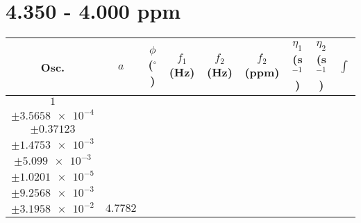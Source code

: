 \documentclass[8pt]{article}
\begin{document}
\section*{4.350 - 4.000 ppm}
\begin{longtable}[l]{c c c c c c c c c}
\toprule
Osc. & $a$ & $\phi$ ($^{\circ}$) & $f_1$ (Hz) & $f_2$ (Hz) & $f_2$ (ppm) & $\eta_1$ (s$^{-1}$) & $\eta_2$ (s$^{-1}$) & $\int$\\
\midrule
$\num{1}$ & \begin{tabular}[c]{@{}c@{}}$\num{5.493e-2}$ \\ $\pm\num{3.5658e-4}$\end{tabular} & \begin{tabular}[c]{@{}c@{}}$\num{-0.53219}$ \\ $\pm\num{0.37123}$\end{tabular} & \begin{tabular}[c]{@{}c@{}}$\num{-9.9663}$ \\ $\pm\num{1.4753e-3}$\end{tabular} & \begin{tabular}[c]{@{}c@{}}$\num{2.0216e+3}$ \\ $\pm\num{5.099e-3}$\end{tabular} & \begin{tabular}[c]{@{}c@{}}$\num{4.0442}$ \\ $\pm\num{1.0201e-5}$\end{tabular} & \begin{tabular}[c]{@{}c@{}}$\num{1.1779}$ \\ $\pm\num{9.2568e-3}$\end{tabular} & \begin{tabular}[c]{@{}c@{}}$\num{4.2579}$ \\ $\pm\num{3.1958e-2}$\end{tabular} & $\num{4.7782}$\\

\end{longtable}
\end{document}
